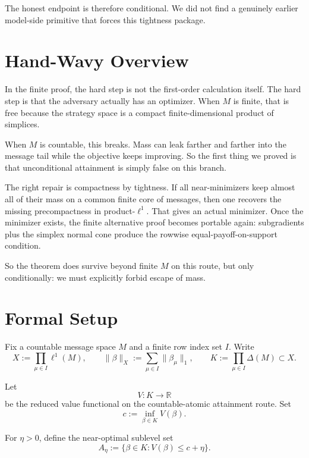 \documentclass[12pt]{article}
\newcommand{\R}{\mathbb{R}}
\begin{document}
The honest endpoint is therefore conditional.
We did not find a genuinely earlier model-side primitive that forces this tightness package.

\section{Hand-Wavy Overview}

In the finite proof, the hard step is not the first-order calculation itself.
The hard step is that the adversary actually has an optimizer.
When $M$ is finite, that is free because the strategy space is a compact finite-dimensional product of simplices.

When $M$ is countable, this breaks.
Mass can leak farther and farther into the message tail while the objective keeps improving.
So the first thing we proved is that unconditional attainment is simply false on this branch.

The right repair is compactness by tightness.
If all near-minimizers keep almost all of their mass on a common finite core of messages, then one recovers the missing precompactness in product-$\ell^1$.
That gives an actual minimizer.
Once the minimizer exists, the finite alternative proof becomes portable again:
subgradients plus the simplex normal cone produce the rowwise equal-payoff-on-support condition.

So the theorem does survive beyond finite $M$ on this route, but only conditionally:
we must explicitly forbid escape of mass.

\section{Formal Setup}

Fix a countable message space $M$ and a finite row index set $I$.
Write
\[
X := \prod_{\mu \in I} \ell^1(M),
\qquad
\|\beta\|_X := \sum_{\mu \in I} \|\beta_\mu\|_1,
\qquad
K := \prod_{\mu \in I} \Delta(M) \subset X.
\]

Let
\[
V : K \to \R
\]
be the reduced value functional on the countable-atomic attainment route.
Set
\[
c := \inf_{\beta \in K} V(\beta).
\]

For $\eta > 0$, define the near-optimal sublevel set
\[
A_\eta := \{ \beta \in K : V(\beta) \le c + \eta \}.
\]
\end{document}
